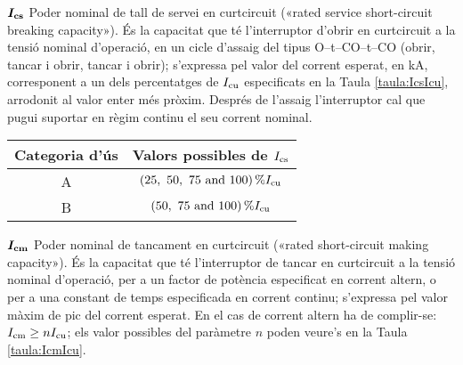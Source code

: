 \begin{list}{}
    \item[$\boldsymbol{I_\mathrm{cs}}$] Poder nominal de tall de servei en curtcircuit («rated service  short-circuit breaking capacity»). És la capacitat que té l'interruptor d'obrir en curtcircuit a la tensió nominal d'operació, en un cicle d'assaig del tipus O--t--CO--t--CO (obrir, tancar i obrir, tancar i obrir); s'expressa pel valor  del corrent esperat, en kA, corresponent a un dels percentatges de $I_\mathrm{cu}$ especificats en la Taula \vref{taula:IcsIcu}, arrodonit al valor enter més pròxim. Després de l'assaig l'interruptor cal que pugui suportar en règim continu  el seu corrent nominal.

        \begin{center}
            \label{taula:IcsIcu}
           \begin{tabular}{cc}
           \toprule[1pt]
           Categoria d'ús &  Valors possibles de $I_\mathrm{cs}$ \\
           \midrule
           A & $\SIlist[list-units = brackets]{25;50;75;100}{\percent} I\ped{cu}$ \\
           B & $\SIlist[list-units = brackets]{50;75;100}{\percent} I\ped{cu}$  \\
           \bottomrule[1pt]
           \end{tabular}
         \end{center}
    \item[$\boldsymbol{I_\mathrm{cm}}$] Poder nominal de tancament en curtcircuit («rated short-circuit making capacity»). És la capacitat que té l'interruptor de tancar en curtcircuit a la tensió nominal d'operació, per a un factor de potència especificat en corrent altern, o per a una constant de temps especificada en corrent continu; s'expressa pel valor màxim de pic del corrent esperat. En el cas de corrent altern ha de complir-se: $I_\mathrm{cm} \geq n I_\mathrm{cu}$; els valor possibles del paràmetre $n$ poden veure's en la Taula \vref{taula:IcmIcu}.


\end{list}

